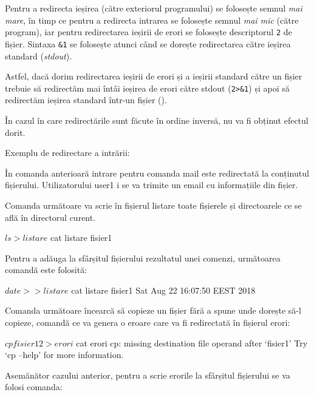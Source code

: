 Pentru a redirecta ieșirea (către exteriorul programului) se folosește semnul
\textit{mai mare}, în timp ce pentru a redirecta intrarea se folosește semnul
\textit{mai mic} (către program), iar pentru redirectarea ieșirii de erori se
folosește descriptorul \texttt{2} de fișier. Sintaxa \texttt{\&1} se folosește
atunci când se dorește redirectarea către ieșirea standard (\textit{stdout}).

Astfel, dacă dorim redirectarea ieșirii de erori și a ieșirii standard către un
fișier trebuie să redirectăm mai întâi ieșirea de erori către stdout
(\texttt{2>\&1}) și apoi să redirectăm ieșirea standard într-un fișier
().

În cazul în care redirectările sunt făcute în ordine inversă, nu va fi obținut
efectul dorit.

Exemplu de redirectare a intrării:


În comanda anterioară intrare pentru comanda mail este redirectată la conținutul
fișierului. Utilizatorului user1 i se va trimite un email cu informațiile din
fișier.

Comanda următoare va scrie în fișierul listare toate fișierele și directoarele
ce se află în directorul curent.

\begin{screen}
$ ls > listare
$ cat listare
fisier1
\end{screen}

Pentru a adăuga la sfârșitul fișierului rezultatul unei comenzi, următoarea
comandă este folosită:

\begin{screen}
$ date >> listare
$ cat listare
fisier1
Sat Aug 22 16:07:50 EEST 2018
\end{screen}

Comanda următoare încearcă să copieze un fișier fără a spune unde dorește să-l
copieze, comandă ce va genera o eroare care va fi redirectată în fișierul erori:

\begin{screen}
$ cp fisier1 2> erori
$ cat erori
cp: missing destination file operand after `fisier1'
Try `cp --help' for more information.
\end{screen}

Asemănător cazului anterior, pentru a scrie erorile la sfârșitul fișierului se
va folosi comanda:

